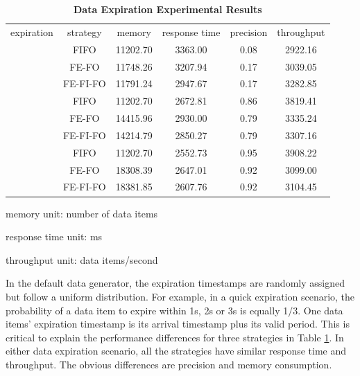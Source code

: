 \begin{table}[!htbp]
\centering
\caption{\textbf{Data Expiration Experimental Results}}
\label{tab:6-dei}
\begin{tabular}{|c||c||c|c|c|c|}
\hline
expiration & strategy & memory & response time & precision & throughput \\ \hhline{|=#=#=|=|=|=|}
\multirow{3}{*}{quick} & FIFO & 11202.70 & 3363.00 & 0.08 & 2922.16 \\ \cline{2-6} 
 					  & FE-FO & 11748.26 & 3207.94 & 0.17 & 3039.05 \\ \cline{2-6} 
 					  & FE-FI-FO & 11791.24 & 2947.67 & 0.17 & 3282.85 \\ \hhline{|=#=#=|=|=|=|}
\multirow{3}{*}{normal} & FIFO & 11202.70 & 2672.81 & 0.86 & 3819.41 \\ \cline{2-6} 
 						& FE-FO & 14415.96 & 2930.00 & 0.79 & 3335.24 \\ \cline{2-6} 
 						& FE-FI-FO & 14214.79 & 2850.27 & 0.79 & 3307.16 \\ \hhline{|=#=#=|=|=|=|}
\multirow{3}{*}{slow} & FIFO & 11202.70 & 2552.73 & 0.95 & 3908.22\\ \cline{2-6} 
					  & FE-FO & 18308.39 & 2647.01 & 0.92 & 3099.00 \\ \cline{2-6} 
 					  & FE-FI-FO & 18381.85 & 2607.76 & 0.92 & 3104.45 \\ \hline
\end{tabular}
	\begin{tablenotes}
 		\item memory unit: number of data items
 		\item response time unit: ms
 		\item throughput unit: data items/second
    \end{tablenotes}
\end{table}

In the default data generator, the expiration timestamps are randomly assigned but follow a uniform distribution.
For example, in a quick expiration scenario, the probability of a data item to expire within 1s, 2s or 3s is equally 1/3.
One data items' expiration timestamp is its arrival timestamp plus its valid period.
This is critical to explain the performance differences for three strategies in Table \ref{tab:6-dei}.
In either data expiration scenario, all the strategies have similar response time and throughput. 
The obvious differences are precision and memory consumption. 

